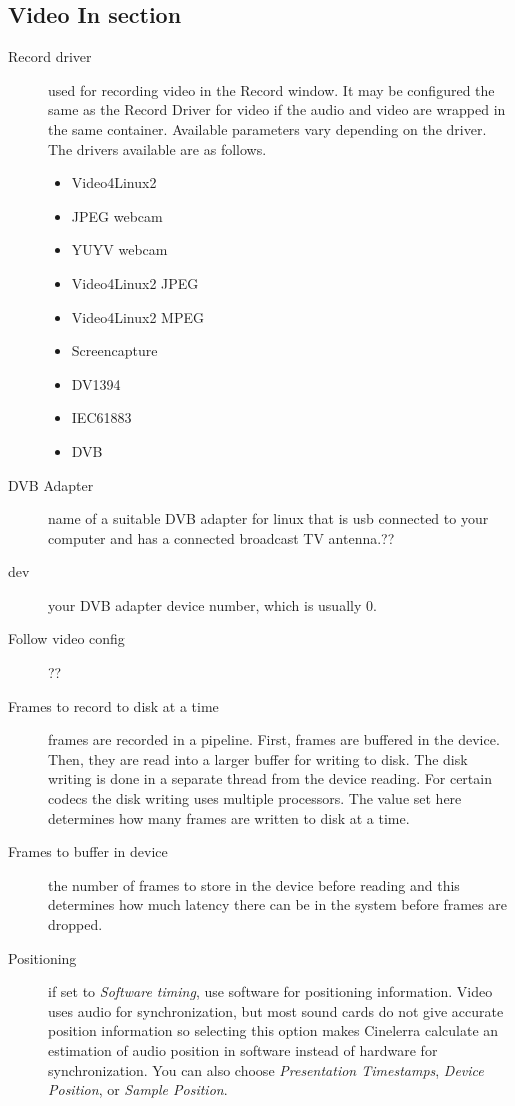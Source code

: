\subsection{Video In section}%
\label{sub:video_in_section}

\begin{description}
    \item[Record driver] used for recording video in the Record window. It may be configured the same as the Record Driver for video if the audio and video are wrapped in the same container. Available parameters vary depending on the driver. The drivers available are as follows.
    \begin{itemize}
        \item Video4Linux2
        \item JPEG webcam
        \item YUYV webcam
        \item Video4Linux2 JPEG
        \item Video4Linux2 MPEG
        \item Screencapture
        \item DV1394
        \item IEC61883
        \item DVB
    \end{itemize}
    \item[DVB Adapter] name of a suitable DVB adapter for linux that is usb connected to your computer and has a connected broadcast TV antenna.??
    \item[dev] your DVB adapter device number, which is usually 0.
    \item[Follow video config] ??
    \item[Frames to record to disk at a time] frames are recorded in a pipeline. First, frames are buffered in the device. Then, they are read into a larger buffer for writing to disk. The disk writing is done in a separate thread from the device reading. For certain codecs the disk writing uses multiple processors. The value set here determines how many frames are written to disk at a time.
    \item[Frames to buffer in device ] the number of frames to store in the device before reading and this determines how much latency there can be in the system before frames are dropped.
    \item[Positioning] if set to \textit{Software timing}, use software for positioning information. Video uses audio for synchronization, but most sound cards do not give accurate position information so selecting this option makes Cinelerra calculate an estimation of audio position in software instead of hardware for synchronization.  You can also choose \textit{Presentation Timestamps}, \textit{Device Position}, or \textit{Sample Position}.

\end{description}
